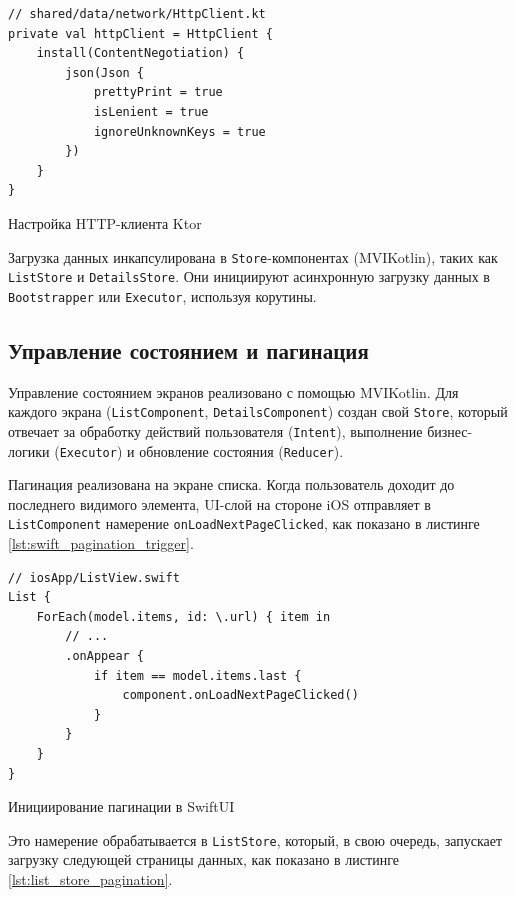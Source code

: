 \documentclass[14pt, russian]{scrartcl}
\begin{document}
\begin{listing}[H]
\begin{verbatim}
// shared/data/network/HttpClient.kt
private val httpClient = HttpClient {
    install(ContentNegotiation) {
        json(Json {
            prettyPrint = true
            isLenient = true
            ignoreUnknownKeys = true
        })
    }
}
\end{verbatim}
\caption{Настройка HTTP-клиента Ktor}
\label{lst:ktor_client}
\end{listing}

Загрузка данных инкапсулирована в \texttt{Store}-компонентах (MVIKotlin), таких как \texttt{ListStore} и \texttt{DetailsStore}. Они инициируют асинхронную загрузку данных в \texttt{Bootstrapper} или \texttt{Executor}, используя корутины.

\subsection{Управление состоянием и пагинация}

Управление состоянием экранов реализовано с помощью MVIKotlin. Для каждого экрана (\texttt{ListComponent}, \texttt{DetailsComponent}) создан свой \texttt{Store}, который отвечает за обработку действий пользователя (\texttt{Intent}), выполнение бизнес-логики (\texttt{Executor}) и обновление состояния (\texttt{Reducer}).

Пагинация реализована на экране списка. Когда пользователь доходит до последнего видимого элемента, UI-слой на стороне iOS отправляет в \texttt{ListComponent} намерение \texttt{onLoadNextPageClicked}, как показано в листинге \ref{lst:swift_pagination_trigger}.

\begin{listing}[H]
\begin{verbatim}
// iosApp/ListView.swift
List {
    ForEach(model.items, id: \.url) { item in
        // ...
        .onAppear {
            if item == model.items.last {
                component.onLoadNextPageClicked()
            }
        }
    }
}
\end{verbatim}
\caption{Инициирование пагинации в SwiftUI}
\label{lst:swift_pagination_trigger}
\end{listing}

Это намерение обрабатывается в \texttt{ListStore}, который, в свою очередь, запускает загрузку следующей страницы данных, как показано в листинге \ref{lst:list_store_pagination}.
\end{document}
